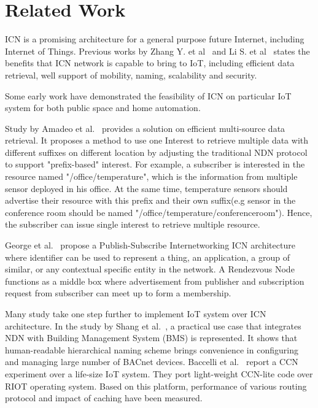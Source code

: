 \section{Related Work}
\label{sec:related}
ICN is a promising architecture for a general purpose future Internet, including Internet of Things. Previous works by Zhang Y. et al~\cite{zhang2013icn} and Li S. et al~\cite{li2014comparative} states the benefits that ICN network is capable to bring to IoT, including efficient data retrieval, well support of mobility, naming, scalability and security.

Some early work have demonstrated the feasibility of ICN on particular IoT system for both public space and home automation.  


Study by Amadeo et al.~\cite{amadeo2014multi} provides a solution on efficient multi-source data retrieval. It proposes a method to use one Interest to retrieve multiple data with different suffixes on different location by adjusting the traditional NDN protocol to support "prefix-based" interest. For example, a subscriber is interested in the resource named "/office/temperature", which is the information from multiple sensor deployed in his office. At the same time, temperature sensors should advertise their resource with this prefix and their own suffix(e.g sensor in the conference room should be named "/office/temperature/conferenceroom"). Hence, the subscriber can issue single interest to retrieve multiple resource.


George et al.~\cite{polyzos2015building} propose a Publish-Subscribe Internetworking ICN architecture
where identifier can be used to represent a thing, an application, a group of similar, or any contextual specific entity in the network. A Rendezvous Node functions as a middle box where advertisement from publisher and subscription request from subscriber can meet up to form a membership. 

Many study take one step further to implement IoT system over ICN architecture. In the study by Shang et al.~\cite{shang2014securing}, a practical use case that integrates NDN with Building Management System (BMS) is represented. It shows that human-readable hierarchical naming scheme brings convenience in configuring and managing large number of BACnet devices. Baccelli et al.~\cite{baccelli2014information} report a CCN experiment over a life-size IoT system. They port light-weight CCN-lite code over RIOT operating system. Based on this platform, performance of various routing protocol and impact of caching have been measured.  

